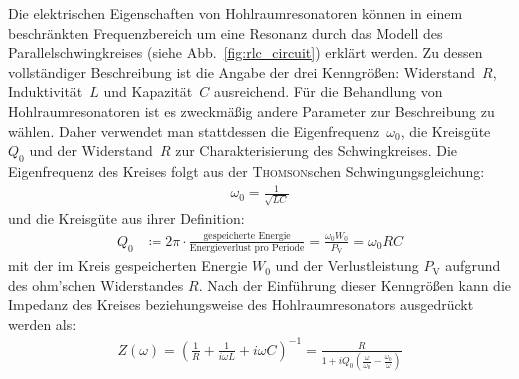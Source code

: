 Die elektrischen Eigenschaften von Hohlraumresonatoren können in einem beschränkten Frequenzbereich um eine Resonanz durch das Modell des Parallelschwingkreises (siehe Abb.\ \ref{fig:rlc_circuit}) erklärt werden.
Zu dessen vollständiger Beschreibung ist die Angabe der drei Kenngrößen: Widerstand~$R$, Induktivität~$L$ und Kapazität~$C$ ausreichend.
Für die Behandlung von Hohlraumresonatoren ist es zweckmäßig andere Parameter zur Beschreibung zu wählen.
Daher verwendet man stattdessen die Eigenfrequenz~$\omega_0$, die Kreisgüte~$Q_0$ und der Widerstand~$R$ zur Charakterisierung des Schwingkreises.
Die Eigenfrequenz des Kreises folgt aus der \textsc{Thomson}schen Schwingungsgleichung:
\begin{align}
  \omega_0 = \frac{1}{\sqrt{L C}}
\end{align}
und die Kreisgüte aus ihrer Definition:
\begin{align}
  Q_0 &\coloneqq 2\pi \cdot \frac{\text{gespeicherte Energie}}{\text{Energieverlust pro Periode}} = \frac{\omega_0 W_0}{P_\mathrm{V}} = \omega_0 R C
  \label{eq:def_guete}
\end{align}
mit der im Kreis gespeicherten Energie $W_0$ und der Verlustleistung $P_\mathrm{V}$ aufgrund des ohm'schen Widerstandes $R$.
Nach der Einführung dieser Kenngrößen kann die Impedanz des Kreises beziehungsweise des Hohlraumresonators ausgedrückt werden als:
\begin{align}
  Z(\omega) = \left( \frac{1}{R} + \frac{1}{i \omega L} + i \omega C \right)^{-1} = \frac{R}{1 + i Q_0 \left( \frac{\omega}{\omega_0}  - \frac{\omega_0}{\omega}\right)}
\end{align}

